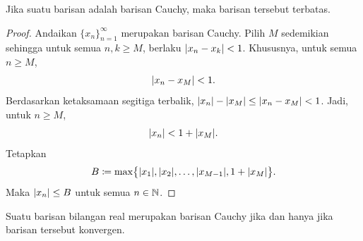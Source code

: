 \begin{prop}
Jika suatu barisan adalah barisan Cauchy, maka barisan tersebut terbatas.
\end{prop}

\begin{proof}
Andaikan $\{ x_n \}_{n=1}^\infty$ merupakan barisan Cauchy.  Pilih $M$ sedemikian sehingga untuk semua
$n,k \geq M$, berlaku $\lvert {x_n-x_k} \rvert < 1$.  Khususnya,
untuk semua $n \geq M$,
\begin{equation*}
\lvert {x_n - x_M} \rvert < 1 .
\end{equation*}
Berdasarkan ketaksamaan segitiga terbalik,
$\lvert {x_n} \rvert - \lvert {x_M} \rvert \leq \lvert {x_n - x_M} \rvert < 1$.  Jadi, untuk $n \geq M$,
\begin{equation*}
\lvert {x_n} \rvert < 1 + \lvert {x_M} \rvert.
\end{equation*}
Tetapkan
\begin{equation*}
B \coloneqq \max \bigl\{ \lvert {x_1} \rvert, \lvert {x_2} \rvert, \ldots,
\lvert {x_{M-1}} \rvert, 1+ \lvert {x_M} \rvert \bigr\} .
\end{equation*}
Maka $\lvert {x_n} \rvert \leq B$ untuk semua $n \in {\mathbb{N}}$.
\end{proof}

\begin{thm}
Suatu barisan bilangan real merupakan barisan Cauchy jika dan hanya jika barisan tersebut konvergen.
\end{thm}


